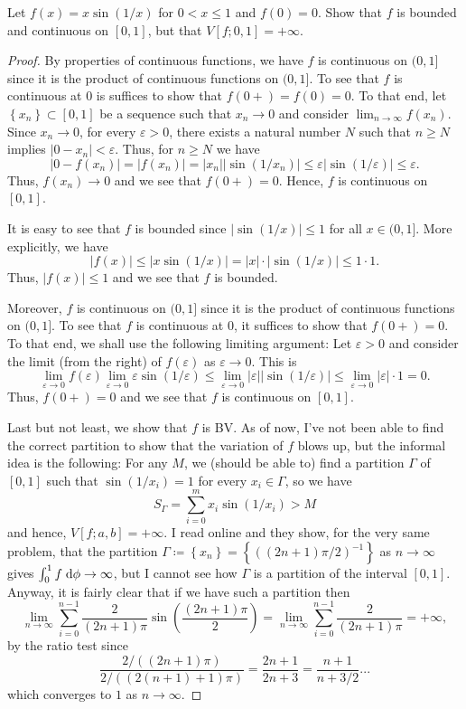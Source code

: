 \begin{problem}
Let $f(x)=x\sin(1/x)$ for $0<x\leq 1$ and $f(0)=0$. Show that $f$ is
bounded and continuous on $[0,1]$, but that $V[f;0,1]=+\infty$.
\end{problem}
\begin{proof}
By properties of continuous functions, we have $f$ is continuous on $(0,1]$
since it is the product of continuous functions on $(0,1]$. To see that $f$
is continuous at $0$ is suffices to show that $f(0+)=f(0)=0$. To that end,
let $\left\{x_n\right\}\subset[0,1]$ be a sequence such that $x_n\to 0$ and
consider $\lim_{n\to\infty} f\left(x_n\right)$. Since $x_n\to 0$, for every
$\varepsilon>0$, there exists a natural number $N$ such that $n\geq N$
implies $|0-x_n|<\varepsilon$. Thus, for $n\geq N$ we have
\[
\left|0-f(x_n)\right|=\left|f(x_n)\right|=
\left|x_n\right|\left|\sin(1/x_n)\right|\leq
\varepsilon\left|\sin(1/\varepsilon)\right|\leq
\varepsilon.
\]
Thus, $f(x_n)\to 0$ and we see that $f(0+)=0$. Hence, $f$ is continuous on
$[0,1]$.


It is easy to see that $f$ is bounded since $|\sin(1/x)|\leq 1$ for all
$x\in(0,1]$. More explicitly, we have
\[
|f(x)|\leq |x\sin(1/x)|=|x|\cdot|\sin(1/x)|\leq 1\cdot 1.
\]
Thus, $|f(x)|\leq 1$ and we see that $f$ is bounded.

Moreover, $f$ is continuous on $(0,1]$ since it is the product of
continuous functions on $(0,1]$. To see that $f$ is continuous at $0$, it
suffices to show that $f(0+)=0$. To that end, we shall use the following
limiting argument: Let $\varepsilon>0$ and consider the limit (from the
right) of $f(\varepsilon)$ as $\varepsilon\to 0$. This is
\[
\lim_{\varepsilon\to 0}f(\varepsilon)
\lim_{\varepsilon\to 0}\varepsilon\sin(1/\varepsilon)\leq
\lim_{\varepsilon\to 0}\left|\varepsilon\right|\left|\sin(1/\varepsilon)\right|
\leq\lim_{\varepsilon\to 0}\left|\varepsilon\right|\cdot 1=0.
\]
Thus, $f(0+)=0$ and we see that $f$ is continuous on $[0,1]$.

Last but not least, we show that $f$ is BV. As of now, I've not been able
to find the correct partition to show that the variation of $f$ blows up,
but the informal idea is the following: For any $M$, we (should be able to)
find a partition $\Gamma$ of $[0,1]$ such that $\sin(1/x_i)=1$ for every
$x_i\in\Gamma$, so we have
\[
S_\Gamma=\sum_{i=0}^m x_i\sin(1/x_i)>M
\]
and hence, $V[f;a,b]=+\infty$. I read online and they show, for the very
same problem, that the partition
$\Gamma\coloneqq\left\{x_n\right\}=\left\{((2n+1)\pi/2)^{-1}\right\}$ as
$n\to\infty$ gives $\int_0^1f\;\mathrm{d}\phi\to\infty$, but I cannot see how
$\Gamma$ is a partition of the interval $[0,1]$. Anyway, it is fairly clear
that if we have such a partition then
\[
\lim_{n\to\infty}\sum_{i=0}^{n-1}\frac{2}{(2n+1)\pi}
\sin\left(\frac{(2n+1)\pi}{2}\right)=
\lim_{n\to\infty}\sum_{i=0}^{n-1}\frac{2}{(2n+1)\pi}=+\infty,
\]
by the ratio test since
\[
\frac{2/((2n+1)\pi)}{2/((2(n+1)+1)\pi)}=\frac{2n+1}{2n+3}=\frac{n+1}{n+3/2}...
\]
which converges to $1$ as $n\to\infty$.
\end{proof}
\newpage

